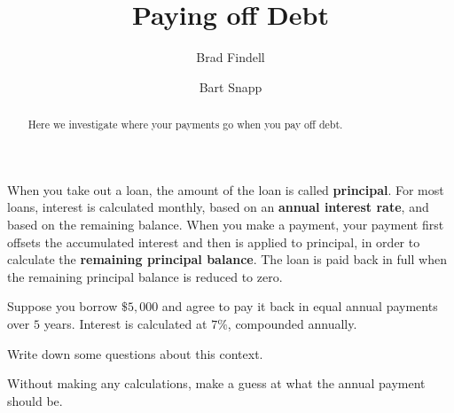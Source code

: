 \documentclass[handout,space,nooutcomes]{ximera}
\title{Paying off Debt}
\author{Brad Findell \and Bart Snapp}
\begin{document}
\begin{abstract}
Here we investigate where your payments go when you pay off debt.
\end{abstract}
\maketitle

When you take out a loan, the amount of the loan is called
\textbf{principal}.  For most loans, interest is calculated monthly,
based on an \textbf{annual interest rate}, and based on the remaining
balance.  When you make a payment, your payment first offsets the
accumulated interest and then is applied to principal, in order to
calculate the \textbf{remaining principal balance}.  The loan is paid
back in full when the remaining principal balance is reduced to zero.

\begin{question}[2.5in]
Suppose you borrow $\$5,000$ and agree to pay it back in equal annual
payments over $5$ years.  Interest is calculated at $7\%$,
compounded annually. 

Write down some questions about this context.  
\begin{freeResponse}
\end{freeResponse}
\vspace{2in}
\end{question}


\begin{question}
Without making any calculations, make a guess at what the annual payment should be.  
\begin{freeResponse}
\end{freeResponse}
\vfill
\end{question}
\end{document}
